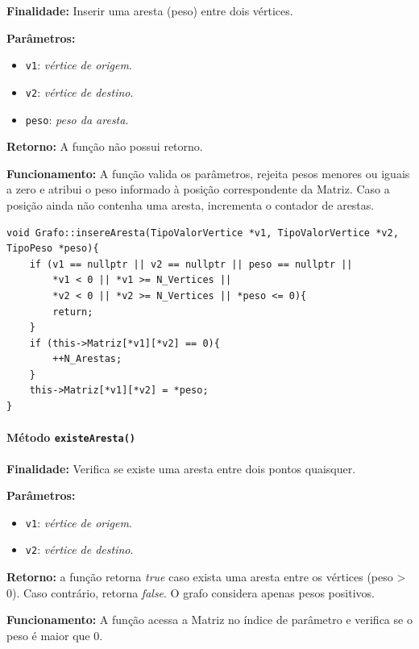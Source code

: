 \documentclass{article}
\begin{document}
    \mbox{}\par
    \noindent
    \textbf{Finalidade:} Inserir uma aresta (peso) entre dois vértices.

    \textbf{Parâmetros:}
    \begin{itemize}
        \item \texttt{v1}: \textit{vértice de origem}.
        \item \texttt{v2}: \textit{vértice de destino}.
        \item \texttt{peso}: \textit{peso da aresta}.
    \end{itemize}

    \textbf{Retorno:} A função não possui retorno.

    \textbf{Funcionamento:} A função valida os parâmetros, rejeita pesos menores ou iguais a zero e atribui o peso informado à posição correspondente da Matriz. Caso a posição ainda não contenha uma aresta, incrementa o contador de arestas.

\begin{verbatim}
void Grafo::insereAresta(TipoValorVertice *v1, TipoValorVertice *v2, TipoPeso *peso){
    if (v1 == nullptr || v2 == nullptr || peso == nullptr ||
        *v1 < 0 || *v1 >= N_Vertices ||
        *v2 < 0 || *v2 >= N_Vertices || *peso <= 0){
        return;
    }
    if (this->Matriz[*v1][*v2] == 0){
        ++N_Arestas;
    }
    this->Matriz[*v1][*v2] = *peso;
}
\end{verbatim}
\paragraph{Método \texttt{existeAresta()}}

    \mbox{}\par
    \noindent
    \textbf{Finalidade:} Verifica se existe uma aresta entre dois pontos quaisquer.

    \textbf{Parâmetros:}
    \begin{itemize}
        \item \texttt{v1}: \textit{vértice de origem}.
        \item \texttt{v2}: \textit{vértice de destino}.
    \end{itemize}

    \textbf{Retorno:} a função retorna \textit{true} caso exista uma aresta entre os vértices (peso > 0). Caso contrário, retorna \textit{false}. O grafo considera apenas pesos positivos.

    \textbf{Funcionamento:} A função acessa a Matriz no índice de parâmetro e verifica se o peso é maior que 0.
\end{document}
